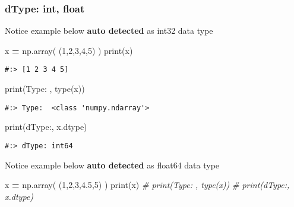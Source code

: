 \documentclass[
]{book}
\newenvironment{Shaded}{\begin{snugshade}}{\end{snugshade}}
\newcommand{\BuiltInTok}[1]{#1}
\newcommand{\CommentTok}[1]{\textcolor[rgb]{0.37,0.37,0.37}{\textit{#1}}}
\newcommand{\DecValTok}[1]{\textcolor[rgb]{0.06,0.06,0.06}{#1}}
\newcommand{\FloatTok}[1]{\textcolor[rgb]{0.06,0.06,0.06}{#1}}
\newcommand{\NormalTok}[1]{#1}
\newcommand{\OperatorTok}[1]{\textcolor[rgb]{0.43,0.43,0.43}{\textbf{#1}}}
\newcommand{\StringTok}[1]{\textcolor[rgb]{0.5,0.5,0.5}{#1}}
\begin{document}
\hypertarget{dtype-int-float}{%
\subsubsection{dType: int, float}\label{dtype-int-float}}

Notice example below \textbf{auto detected} as int32 data type

\begin{Shaded}
\begin{Highlighting}[]
\NormalTok{x }\OperatorTok{=}\NormalTok{ np.array( (}\DecValTok{1}\NormalTok{,}\DecValTok{2}\NormalTok{,}\DecValTok{3}\NormalTok{,}\DecValTok{4}\NormalTok{,}\DecValTok{5}\NormalTok{) )}
\BuiltInTok{print}\NormalTok{(x)}
\end{Highlighting}
\end{Shaded}

\begin{verbatim}
#:> [1 2 3 4 5]
\end{verbatim}

\begin{Shaded}
\begin{Highlighting}[]
\BuiltInTok{print}\NormalTok{(}\StringTok{\textquotesingle{}Type: \textquotesingle{}}\NormalTok{, }\BuiltInTok{type}\NormalTok{(x))}
\end{Highlighting}
\end{Shaded}

\begin{verbatim}
#:> Type:  <class 'numpy.ndarray'>
\end{verbatim}

\begin{Shaded}
\begin{Highlighting}[]
\BuiltInTok{print}\NormalTok{(}\StringTok{\textquotesingle{}dType:\textquotesingle{}}\NormalTok{, x.dtype)}
\end{Highlighting}
\end{Shaded}

\begin{verbatim}
#:> dType: int64
\end{verbatim}

Notice example below \textbf{auto detected} as float64 data type

\begin{Shaded}
\begin{Highlighting}[]
\NormalTok{x }\OperatorTok{=}\NormalTok{ np.array( (}\DecValTok{1}\NormalTok{,}\DecValTok{2}\NormalTok{,}\DecValTok{3}\NormalTok{,}\FloatTok{4.5}\NormalTok{,}\DecValTok{5}\NormalTok{) )}
\BuiltInTok{print}\NormalTok{(x)}
\CommentTok{\# print(\textquotesingle{}Type: \textquotesingle{}, type(x))}
\CommentTok{\# print(\textquotesingle{}dType:\textquotesingle{}, x.dtype)}
\end{Highlighting}
\end{Shaded}
\end{document}
